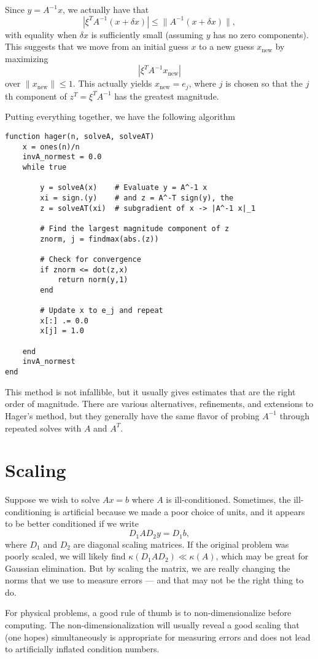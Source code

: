 \documentclass[12pt, leqno]{article} %
\begin{document}
Since $y = A^{-1} x$, we actually have that
\[
  |\xi^T A^{-1} (x+\delta x)| \leq \|A^{-1} (x+\delta x)\|,
\]
with equality when $\delta x$ is sufficiently small (assuming $y$ has
no zero components).  This suggests that we move from an initial guess $x$
to a new guess $x_{\mathrm{new}}$ by maximizing
\[
  |\xi^T A^{-1} x_{\mathrm{new}}|
\]
over $\|x_{\mathrm{new}}\| \leq 1$.  This actually yields $x_{\mathrm{new}} = e_j$,
where $j$ is chosen so that the $j$th component of
$z^T = \xi^T A^{-1}$ has the greatest magnitude.

Putting everything together, we have the following algorithm
\begin{lstlisting}
function hager(n, solveA, solveAT)
    x = ones(n)/n
    invA_normest = 0.0
    while true

        y = solveA(x)    # Evaluate y = A^-1 x
        xi = sign.(y)    # and z = A^-T sign(y), the
        z = solveAT(xi)  # subgradient of x -> |A^-1 x|_1

        # Find the largest magnitude component of z
        znorm, j = findmax(abs.(z))

        # Check for convergence
        if znorm <= dot(z,x)
            return norm(y,1)
        end

        # Update x to e_j and repeat
        x[:] .= 0.0
        x[j] = 1.0

    end
    invA_normest
end
\end{lstlisting}

This method is not infallible, but it usually gives estimates that are
the right order of magnitude.  There are various alternatives,
refinements, and extensions to Hager's method, but they generally have
the same flavor of probing $A^{-1}$ through repeated solves with $A$
and $A^T$.

\section{Scaling}

Suppose we wish to solve $Ax = b$ where $A$ is ill-conditioned.  Sometimes,
the ill-conditioning is artificial because we made a poor choice of units,
and it appears to be better conditioned if we write
\[
  D_1 A D_2 y = D_1 b,
\]
where $D_1$ and $D_2$ are diagonal scaling matrices.  If the original problem
was poorly scaled, we will likely find $\kappa(D_1 A D_2) \ll \kappa(A)$,
which may be great for Gaussian elimination.  But by scaling the matrix, we
are really changing the norms that we use to measure errors --- and that may
not be the right thing to do.

For physical problems, a good rule of thumb is to non-dimensionalize
before computing.  The non-dimensionalization will usually reveal a good
scaling that (one hopes) simultaneously is appropriate for measuring errors
and does not lead to artificially inflated condition numbers.
\end{document}
